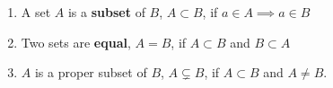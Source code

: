 
\begin{definition}

	\begin{enumerate}
		\item A set $A$ is a \textbf{subset} of $B$, $A \subset B$, if $a \in  A \implies a \in B$ 
		\item Two sets are \textbf{equal}, $A = B$, if $A \subset B$ and $B \subset A$ 
		\item $A$ is a proper subset of $B$, $A \subsetneq B$, if $A \subset B$ and $A \neq B$.
	\end{enumerate}
\end{definition}
